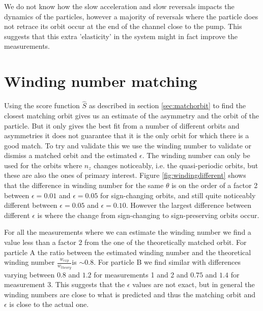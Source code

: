 We do not know how the slow acceleration and slow reversals impacts the dynamics of the particles, however a majority of reversals where the particle does not retrace its orbit occur at the end of the channel close to the pump. This suggests that this extra 'elasticity' in the system might in fact improve the measurements. 

\section{Winding number matching}
Using the score function $\hat{S}$ as described in section \ref{sec:matchorbit} to find the closest matching orbit gives us an estimate of the asymmetry and the orbit of the particle. But it only gives the best fit from a number of different orbits and asymmetries it does not guarantee that it is the only orbit for which there is a good match.  To try and validate this we use the winding number to validate or dismiss a matched orbit and the estimated $\epsilon$. The winding number can only be used for the orbits where $n_z$ changes noticeably, i.e. the quasi-periodic orbits, but these are also the ones of primary interest. 
Figure \ref{fig:windingdifferent} shows that the difference in winding number for the same $\theta$ is on the order of a factor 2 between $\epsilon = 0.01$ and $\epsilon = 0.05$ for sign-changing orbits, and  still quite noticeably different between $\epsilon = 0.05$ and $\epsilon = 0.10$. However the largest difference between different $\epsilon$ is where the change from sign-changing to sign-preserving orbits occur. 

For all the measurements where we can estimate the winding number we find a value less than a factor 2 from the one of the theoretically matched orbit. For particle A the ratio between the estimated winding number and the theoretical winding number $\frac{w_{exp}}{w_{theory}}$is ${\sim}0.8$. For particle B we find similar with differences varying between $0.8$ and $1.2$ for measurements 1 and 2 and $0.75$ and $1.4$ for measurement 3. This suggests that the $\epsilon$ values are not exact, but in general the winding numbers are close to what is predicted and thus the matching orbit and $\epsilon$ is close to the actual one. 

